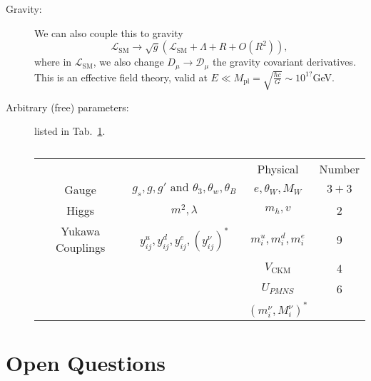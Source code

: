 \begin{description}
  \item[Gravity:] We can also couple this to gravity
    \begin{equation}
      \mathscr{L}_{\text{SM}} \to \sqrt{g} \left( \mathscr{L}_{\text{SM}} + \Lambda + R + O(R^2) \right),
    \end{equation}
    where in $\mathscr{L}_{\text{SM}}$, we also change $D_{\mu} \to \mathcal{D}_{\mu}$ the gravity covariant derivatives.
    This is an effective field theory, valid at $E \ll M_{\text{pl}} = \sqrt{\frac{\hbar c}{G}} \sim 10^{1?}$GeV.
  \item[Arbitrary (free) parameters:] listed in Tab.~\ref{tab:parameters}.
    \begin{table}[htpb]
      \centering
      \begin{tabular}{c c c c}
       &  & Physical & Number \\
      Gauge & $g_s, g, g' \text{ and } \theta_3, \theta_w, \theta_B $ & $e, \theta_W, M_W$ & $3 + 3$ \\
      Higgs & $m^2, \lambda$ & $m_h, v$ & 2 \\
      Yukawa Couplings & $y^{u}_{ij}, y^{d}_{ij}, y^{e}_{ij}, (y^{\nu}_{ij})^*$ & $m^{u}_{i}, m^{d}_{i}, m^{e}_{i} $ & 9 \\
       &  & $V_{\text{CKM}}$ & 4 \\
        &  & $U_{PMNS}$ & 6 \\
	&  &  $(m^{\nu}_{i}, M^{\nu}_{i})^*$ & \\
      \end{tabular}
      \caption{}
      \label{tab:parameters}
    \end{table}
\end{description}

\section{Open Questions}%
\label{sec:open_questions}

